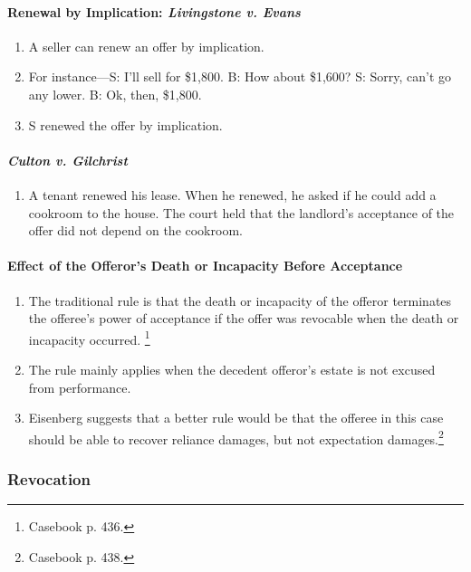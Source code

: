 \paragraph{Renewal by Implication: \emph{Livingstone v. Evans}}

\begin{enumerate}
    \item A seller can renew an offer by implication.
    \item For instance---S: I'll sell for \$1,800. B: How about \$1,600? S: 
    Sorry, can't go any lower. B: Ok, then, \$1,800.
    \item S renewed the offer by implication.
\end{enumerate}

\paragraph{\emph{Culton v. Gilchrist}}

\begin{enumerate}
    \item A tenant renewed his lease. When he renewed, he asked if he could 
    add a cookroom to the house. The court held that the landlord's acceptance 
    of the offer did not depend on the cookroom.
\end{enumerate}

\paragraph{Effect of the Offeror's Death or Incapacity Before Acceptance}

\begin{enumerate}
    \item The traditional rule is that the death or incapacity of the offeror 
    terminates the offeree's power of acceptance if the offer was revocable 
    when the death or incapacity occurred. \footnote{Casebook p. 436.}
    \item The rule mainly applies when the decedent offeror's estate is not 
    excused from performance.
    \item Eisenberg suggests that a better rule would be that the offeree in 
    this case should be able to recover reliance damages, but not expectation 
    damages.\footnote{Casebook p. 438.}
\end{enumerate}

\subsubsection{Revocation}

